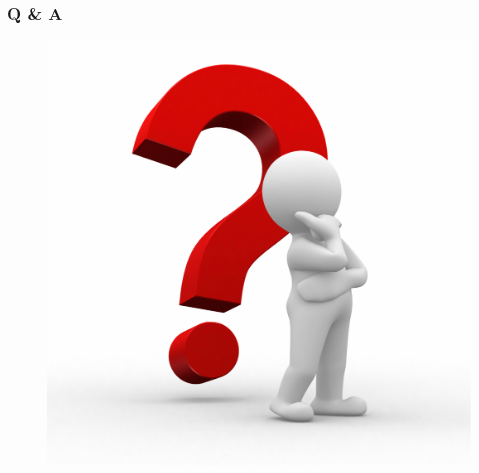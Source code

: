 \documentclass[compress]{beamer}
\begin{document}
\begin{frame}
\frametitle{Q \& A}
\begin{figure}[h!tb]
\includegraphics[height=0.7\textheight]{../resources/question.pdf}
\end{figure}
\end{frame}
\end{document}
